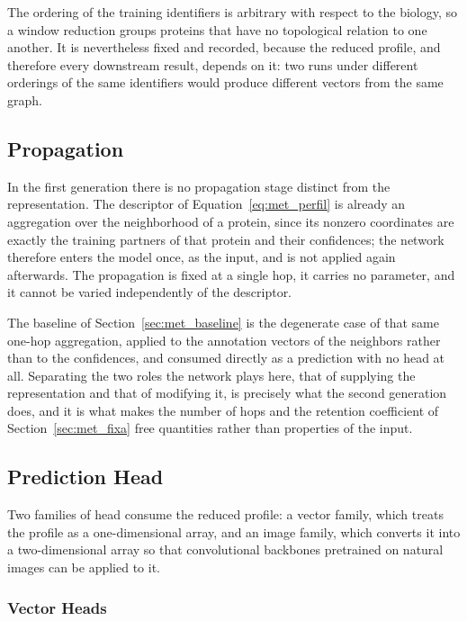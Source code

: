 \documentclass[Ingles]{ic-tese-v3}
\begin{document}
The ordering of the training identifiers is arbitrary with respect to the biology, so a window
reduction groups proteins that have no topological relation to one another. It is nevertheless fixed
and recorded, because the reduced profile, and therefore every downstream result, depends on it: two
runs under different orderings of the same identifiers would produce different vectors from the same
graph.

\subsection{Propagation}
\label{sec:met_prop_gen1}

In the first generation there is no propagation stage distinct from the representation. The
descriptor of Equation~\eqref{eq:met_perfil} is already an aggregation over the neighborhood of a
protein, since its nonzero coordinates are exactly the training partners of that protein and their
confidences; the network therefore enters the model once, as the input, and is not applied again
afterwards. The propagation is fixed at a single hop, it carries no parameter, and it cannot be
varied independently of the descriptor.

The baseline of Section~\ref{sec:met_baseline} is the degenerate case of that same one-hop
aggregation, applied to the annotation vectors of the neighbors rather than to the confidences, and
consumed directly as a prediction with no head at all. Separating the two roles the network plays
here, that of supplying the representation and that of modifying it, is precisely what the second
generation does, and it is what makes the number of hops and the retention coefficient of
Section~\ref{sec:met_fixa} free quantities rather than properties of the input.

\subsection{Prediction Head}
\label{sec:met_heads_gen1}

Two families of head consume the reduced profile: a vector family, which treats the profile as a
one-dimensional array, and an image family, which converts it into a two-dimensional array so that
convolutional backbones pretrained on natural images can be applied to it.

\subsubsection{Vector Heads}
\label{sec:met_gen1_vetor}
\end{document}
